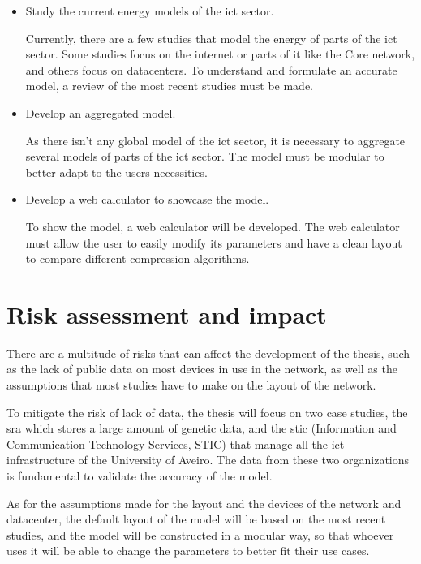 \begin{itemize}
    \item Study the current energy models of the \ac{ict} sector.

    Currently, there are a few studies that model the energy of parts of the \ac{ict} sector. Some studies focus on the internet or parts of it like the Core network, and others focus on datacenters. To understand and formulate an accurate model, a review of the most recent studies must be made. 

    \item Develop an aggregated model.

    As there isn't any global model of the \ac{ict} sector, it is necessary to aggregate several models of parts of the \ac{ict} sector. The model must be modular to better adapt to the users necessities.

    \item Develop a web calculator to showcase the model.

    To show the model, a web calculator will be developed. The web calculator must allow the user to easily modify its parameters and have a clean layout to compare different compression algorithms.

\end{itemize}

\section{Risk assessment and impact}

There are a multitude of risks that can affect the development of the thesis, such as the lack of public data on most devices in use in the network, as well as the assumptions that most studies have to make on the layout of the network.

To mitigate the risk of lack of data, the thesis will focus on two case studies, the \ac{sra} which stores a large amount of genetic data, and the \acl{stic} (Information and Communication Technology Services, STIC) that manage all the \ac{ict} infrastructure of the University of Aveiro. The data from these two organizations is fundamental to validate the accuracy of the model. 

As for the assumptions made for the layout and the devices of the network and datacenter, the default layout of the model will be based on the most recent studies, and the model will be constructed in a modular way, so that whoever uses it will be able to change the parameters to better fit their use cases.

